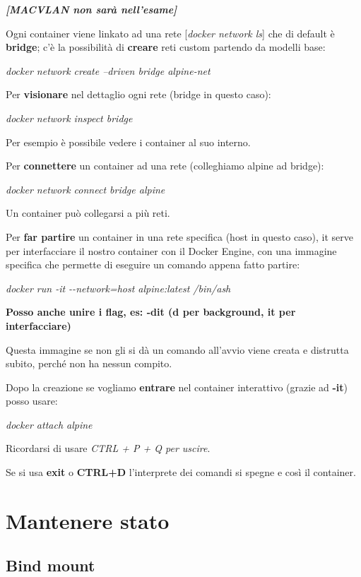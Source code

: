 \emph{\textbf{{[}MACVLAN non sarà nell'esame{]}}}

Ogni container viene linkato ad una rete {[}\emph{docker network ls}{]}
che di default è \textbf{bridge}; c'è la possibilità di \textbf{creare}
reti custom partendo da modelli base:

\emph{docker network create --driven bridge alpine-net}

Per \textbf{visionare} nel dettaglio ogni rete (bridge in questo caso):

\emph{docker network inspect bridge}

Per esempio è possibile vedere i container al suo interno.

Per \textbf{connettere} un container ad una rete (colleghiamo alpine ad
bridge):

\emph{docker network connect bridge alpine}

Un container può collegarsi a più reti.

Per \textbf{far partire} un container in una rete specifica (host in
questo caso), it serve per interfacciare il nostro container con il
Docker Engine, con una immagine specifica che permette di eseguire un
comando appena fatto partire:

\emph{docker run -it -\/-network=host alpine:latest /bin/ash}

\textbf{Posso anche unire i flag, es: -dit (d per background, it per
interfacciare)}

Questa immagine se non gli si dà un comando all'avvio viene creata e
distrutta subito, perché non ha nessun compito.

Dopo la creazione se vogliamo \textbf{entrare} nel container interattivo
(grazie ad \textbf{-it}) posso usare:

\emph{docker attach alpine}

Ricordarsi di usare \emph{CTRL + P + Q per uscire}.

Se si usa \textbf{exit} o \textbf{CTRL+D} l'interprete dei comandi si
spegne e così il container.

\section{Mantenere stato}\label{mantenere-stato}

\subsection{Bind mount}\label{bind-mount}

